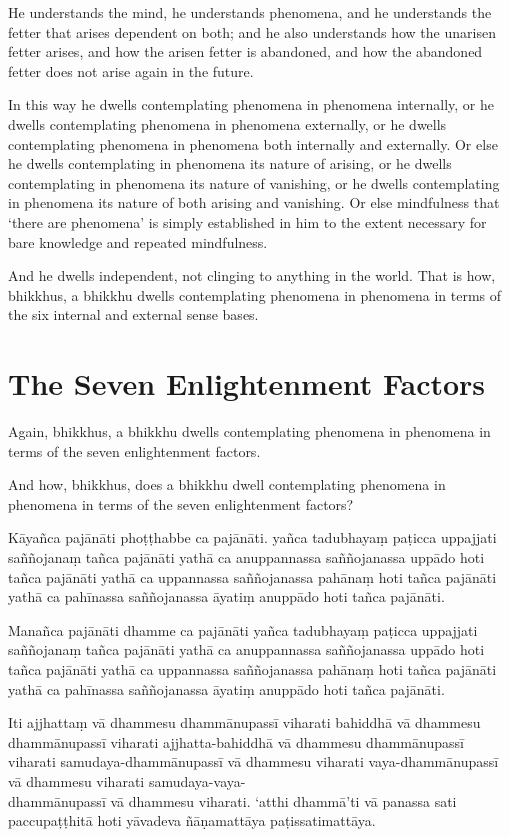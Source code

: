 He understands the mind, he understands phenomena, and he understands the fetter
that arises dependent on both; and he also understands how the unarisen fetter
arises, and how the arisen fetter is abandoned, and how the abandoned fetter
does not arise again in the future.

In this way he dwells contemplating phenomena in phenomena internally, or he
dwells contemplating phenomena in phenomena externally, or he dwells
contemplating phenomena in phenomena both internally and externally. Or else he
dwells contemplating in phenomena its nature of arising, or he dwells
contemplating in phenomena its nature of vanishing, or he dwells contemplating
in phenomena its nature of both arising and vanishing. Or else mindfulness that
‘there are phenomena’ is simply established in him to the extent necessary for
bare knowledge and repeated mindfulness.

And he dwells independent, not clinging to anything in the world. That is how,
bhikkhus, a bhikkhu dwells contemplating phenomena in phenomena in terms of the
six internal and external sense bases.


\section{The Seven Enlightenment Factors}

Again, bhikkhus, a bhikkhu dwells contemplating phenomena in phenomena in terms
of the seven enlightenment factors.

And how, bhikkhus, does a bhikkhu dwell contemplating phenomena in phenomena in
terms of the seven enlightenment factors?

\paliPage

Kāyañca pajānāti phoṭṭhabbe ca pajānāti. yañca tadubhayaṃ paṭicca uppajjati
saññojanaṃ tañca pajānāti yathā ca anuppannassa saññojanassa uppādo hoti tañca
pajānāti yathā ca uppannassa saññojanassa pahānaṃ hoti tañca pajānāti yathā ca
pahīnassa saññojanassa āyatiṃ anuppādo hoti tañca pajānāti.

Manañca pajānāti dhamme ca pajānāti yañca tadubhayaṃ paṭicca uppajjati
saññojanaṃ tañca pajānāti yathā ca anuppannassa saññojanassa uppādo hoti tañca
pajānāti yathā ca uppannassa saññojanassa pahānaṃ hoti tañca pajānāti yathā ca
pahīnassa saññojanassa āyatiṃ anuppādo hoti tañca pajānāti.

Iti ajjhattaṃ vā dhammesu dhammānupassī viharati bahiddhā vā dhammesu
dhammānupassī viharati ajjhatta-bahiddhā vā dhammesu dhammānupassī viharati
samudaya-dhammānupassī vā dhammesu viharati vaya-dhammānupassī vā dhammesu
viharati samudaya-vaya-\\
dhammānupassī vā dhammesu viharati. `atthi dhammā'ti vā
panassa sati paccupaṭṭhitā hoti yāvadeva ñāṇamattāya paṭissatimattāya.

